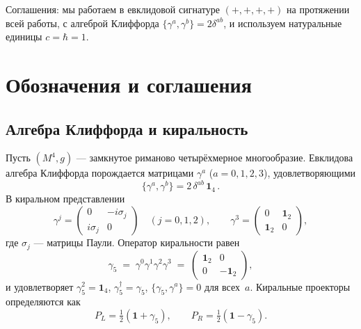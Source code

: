 \documentclass[12pt,a4paper]{article}
\theoremstyle{definition}
\theoremstyle{remark}
\begin{document}
Соглашения: мы работаем в евклидовой сигнатуре $(+,+,+,+)$ на протяжении
всей работы, с алгеброй Клиффорда $\{\gamma^a, \gamma^b\} = 2\delta^{ab}$,
и используем натуральные единицы $c = \hbar = 1$.


\section{Обозначения и соглашения}
\label{sec:notation}

\subsection{Алгебра Клиффорда и киральность}

Пусть $(M^4, g)$ --- замкнутое риманово четырёхмерное многообразие.
Евклидова алгебра Клиффорда порождается матрицами $\gamma^a$
($a = 0,1,2,3$), удовлетворяющими
\begin{equation}\label{eq:clifford}
  \{\gamma^a, \gamma^b\} = 2\,\delta^{ab}\,\mathbf{1}_4\,.
\end{equation}
В киральном представлении
\begin{equation}
  \gamma^j = \begin{pmatrix} 0 & -i\sigma_j \\ i\sigma_j & 0 \end{pmatrix}
  \quad (j = 0,1,2), \qquad
  \gamma^3 = \begin{pmatrix} 0 & \mathbf{1}_2 \\ \mathbf{1}_2 & 0 \end{pmatrix},
\end{equation}
где $\sigma_j$ --- матрицы Паули.  Оператор киральности равен
\begin{equation}\label{eq:g5}
  \gamma_5 \;=\; \gamma^0 \gamma^1 \gamma^2 \gamma^3
  \;=\; \begin{pmatrix} \mathbf{1}_2 & 0 \\ 0 & -\mathbf{1}_2 \end{pmatrix},
\end{equation}
и удовлетворяет $\gamma_5^2 = \mathbf{1}_4$, $\gamma_5^\dagger = \gamma_5$,
$\{\gamma_5, \gamma^a\} = 0$ для всех~$a$.  Киральные проекторы определяются
как
\begin{equation}
  P_L = \tfrac{1}{2}(\mathbf{1} + \gamma_5), \qquad
  P_R = \tfrac{1}{2}(\mathbf{1} - \gamma_5).
\end{equation}
\end{document}
